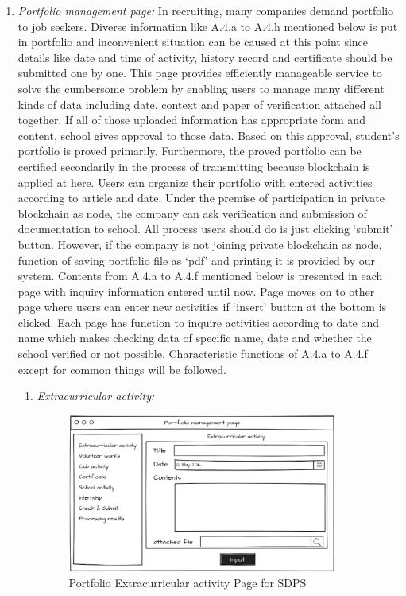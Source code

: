 \documentclass[conference]{IEEEtran}
\begin{document}
\begin{enumerate}
       \item \textit {Portfolio management page: }In recruiting, many companies demand portfolio to job seekers. Diverse information like A.4.a to A.4.h mentioned below is put in portfolio and inconvenient situation can be caused at this point since details like date and time of activity, history record and certificate should be submitted one by one. This page provides efficiently manageable service to solve the cumbersome problem by enabling users to manage many different kinds of data including date, context and paper of verification attached all together. If all of those uploaded information has appropriate form and content, school gives approval to those data. Based on this approval, student’s portfolio is proved primarily. Furthermore, the proved portfolio can be certified secondarily in the process of transmitting because blockchain is applied at here. Users can organize their portfolio with entered activities according to article and date. Under the premise of participation in private blockchain as node, the company can ask verification and submission of documentation to school. All process users should do is just clicking ‘submit’ button. However, if the company is not joining private blockchain as node, function of saving portfolio file as ‘pdf’ and printing it is provided by our system. Contents from A.4.a to A.4.f mentioned below is presented in each page with inquiry information entered until now. Page moves on to other page where users can enter new activities if ‘insert’ button at the bottom is clicked. Each page has function to inquire activities according to date and name which makes checking data of specific name, date and whether the school verified or not possible. Characteristic functions of A.4.a to A.4.f except for common things will be followed.\\
    \begin{enumerate}
    	\item  \textit{Extracurricular activity: }
	\begin{figure}[htbp]
	\centerline{\includegraphics[width=89mm,scale=0.5]{student/portfolio_external_activity.png}}
	\caption{Portfolio Extracurricular activity Page for SDPS}
	\label{fig}
	\end{figure} 
	

\end{enumerate}
\end{enumerate}
\end{document}
